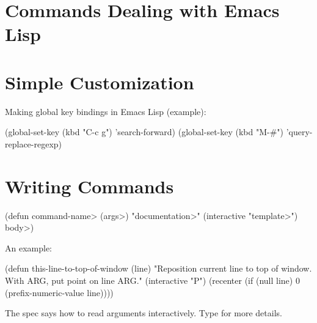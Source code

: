 
\section{Commands Dealing with Emacs Lisp}


\section{Simple Customization}



Making global key bindings in Emacs Lisp (example):

\beginexample%
(global-set-key (kbd "C-c g") 'search-forward)
(global-set-key (kbd "M-\#") 'query-replace-regexp)
\endexample

\section{Writing Commands}

\beginexample%
(defun \<command-name> (\<args>)
  "\<documentation>" (interactive "\<template>")
  \<body>)
\endexample

An example:

\beginexample%
(defun this-line-to-top-of-window (line)
  "Reposition current line to top of window.
With ARG, put point on line ARG."
  (interactive "P")
  (recenter (if (null line)
                0
              (prefix-numeric-value line))))
\endexample

The  spec says how to read arguments interactively.
Type  for more details.

\copyrightnotice

\bye


